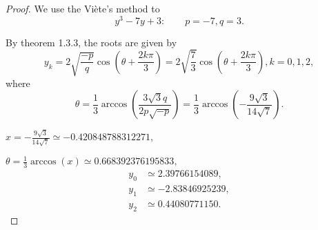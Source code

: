 \documentclass[11pt,a4paper]{article}
\begin{document}
\begin{proof}
We use the Vi\`ete's method to
$$y^3 - 7y +3 : \qquad p=-7,q=3.$$

By theorem 1.3.3, the roots are given by
$$y_k =2\sqrt{\frac{-p}{q}} \cos \left(\theta + \frac{2k\pi}{3}\right)= 2\sqrt{\frac{7}{3}} \cos\left (\theta + \frac{2k\pi}{3}\right), k=0,1,2,$$
where
$$\theta = \frac{1}{3}\arccos\left(  \frac{3\sqrt{3}q}{2p\sqrt{-p}}\right)= \frac{1}{3}\arccos\left(  -\frac{9\sqrt{3}}{14\sqrt{7}}\right).$$

$x =  -\frac{9\sqrt{3}}{14\sqrt{7}} \simeq -0.420848788312271,$

$\theta = \frac{1}{3}\arccos(x) \simeq 0.668392376195833,$
\begin{align*}
y_0 &\simeq 2.39766154089,\\
y_1 &\simeq-2.83846925239,\\
y_2&\simeq 0.44080771150.
\end{align*}
\end{proof}
\end{document}
